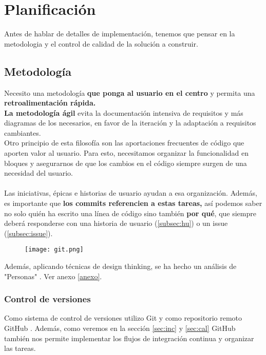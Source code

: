 \chapter{Planificación}

Antes de hablar de detalles de implementación, tenemos que pensar en la metodologia y el control de calidad de la solución a construir.

\section{Metodología}

Necesito una metodología \textbf{que ponga al usuario en el centro} y permita una \textbf{retroalimentación rápida.} \\
\textbf{La metodología ágil} evita la documentación intensiva de requisitos y más diagramas de los necesarios, en favor de la iteración y la adaptación a requisitos cambiantes.\\

Otro principio de esta filosofía son las aportaciones frecuentes de código que aporten valor al usuario. Para esto, 
necesitamos organizar la funcionalidad en bloques y asegurarnos de que los cambios en el código siempre surgen
de una necesidad del usuario. \\ \\
Las iniciativas, épicas e historias de usuario ayudan a esa organización.
Además, es importante que \textbf{los commits referencien a estas tareas,} así podemos
saber no solo quién ha escrito una línea de código sino también \textbf{por qué}, que siempre deberá responderse con una historia de usuario (\ref{subsec:hu}) o un issue (\ref{subsec:issue}).

\begin{figure}[H]
\centering	
\texttt{[image: git.png]}
\end{figure}

Además, aplicando técnicas de design thinking, se ha hecho un análisis de "Personas" \cite{personas}. Ver anexo \ref{anexo}.

\subsection{Control de versiones}
Como sistema de control de versiones utilizo Git y como repositorio remoto GitHub \cite{repo}. Además, como veremos en la sección \ref{sec:inc} y \ref{sec:cal} GitHub
también nos permite implementar los flujos de integración continua y organizar las tareas.

